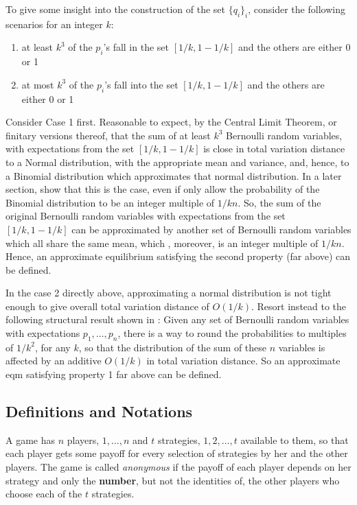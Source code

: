 To give some insight into the construction of the set $\{q_i\}_i$, consider the following scenarios for an integer $k$:
\begin{enumerate}
	\item at least $k^3$ of the $p_i$'s fall in the set $[1/k, 1 - 1/k]$ and the others are either 0 or 1 
	\item at most $k^3$ of the $p_i$'s fall into the set $[1/k, 1- 1/k]$ and the others are either 0 or 1
\end{enumerate}
Consider Case 1 first. Reasonable to expect, by the Central Limit Theorem, or finitary versions thereof, that the sum of at least $k^3$ Bernoulli random variables, with expectations from the set $[1/k, 1-1/k]$ is close in total variation distance to a Normal distribution, with the appropriate mean and variance, and, hence, to a Binomial distribution which approximates that normal distribution. In a later section, show that this is the case, even if only allow the probability of the Binomial distribution to be an integer multiple of $1/kn$. So, the sum of the original Bernoulli random variables with expectations from the set $[1/k, 1- 1/k]$ can be approximated by another set of Bernoulli random variables which all share the same mean, which , moreover, is an integer multiple of $1/kn$. Hence, an approximate equilibrium satisfying the second property (far above) can be defined. 

In the case 2 directly above, approximating a normal distribution is not tight enough to give overall total variation distance of $O(1/k)$. Resort instead to the following structural result shown in \citet{DP-2007}: Given any set of Bernoulli random variables with expectations $p_1, \dots, p_n$, there is a way to round the probabilities to multiples of $1/k^2$, for any $k$, so that the distribution of the sum of these $n$ variables is affected by an additive $O(1/k)$ in total variation distance. So an approximate eqm satisfying property 1 far above can be defined. 

\subsection{Definitions and Notations}

A game has $n$ players, $1, \dots, n$ and $t$ strategies, $1, 2, \dots, t$ available to them, so that each player gets some payoff for every selection of strategies by her and the other players. The game is called \emph{anonymous} if the payoff of each player depends on her strategy and only the \textbf{number}, but not the identities of, the other players who choose each of the $t$ strategies. 

